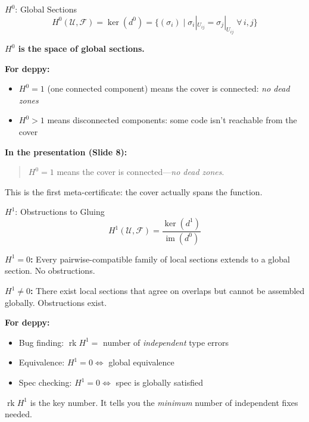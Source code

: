 \documentclass[aspectratio=169,10pt]{beamer}
\newcommand{\Fscr}{\mathcal{F}}
\newcommand{\Uscr}{\mathcal{U}}
\newcommand{\im}{\operatorname{im}}
\newcommand{\rk}{\operatorname{rk}}
\begin{document}
\begin{frame}{$H^0$: Global Sections}
\[
H^0(\Uscr, \Fscr) = \ker(d^0) = \{(\sigma_i) \mid \sigma_i|_{U_{ij}} = \sigma_j|_{U_{ij}} \;\forall\, i,j\}
\]

\textbf{$H^0$ is the space of global sections.}

\vspace{0.3em}
\textbf{For deppy:}
\begin{itemize}
  \item $H^0 = 1$ (one connected component) means the cover is connected: \emph{no dead zones}
  \item $H^0 > 1$ means disconnected components: some code isn't reachable from the cover
\end{itemize}

\textbf{In the presentation (Slide 8):}
\begin{quote}
$H^0 = 1$ means the cover is connected---\emph{no dead zones}.
\end{quote}

This is the first meta-certificate: the cover actually spans the function.
\end{frame}

\begin{frame}{$H^1$: Obstructions to Gluing}
\[
H^1(\Uscr, \Fscr) = \frac{\ker(d^1)}{\im(d^0)}
\]

\textbf{$H^1 = 0$:} Every pairwise-compatible family of local sections extends to a global section. \textcolor{good}{No obstructions.}

\textbf{$H^1 \neq 0$:} There exist local sections that agree on overlaps but cannot be assembled globally. \textcolor{exred}{Obstructions exist.}

\vspace{0.3em}
\textbf{For deppy:}
\begin{itemize}
  \item Bug finding: $\rk H^1 =$ number of \emph{independent} type errors
  \item Equivalence: $H^1 = 0 \Leftrightarrow$ global equivalence
  \item Spec checking: $H^1 = 0 \Leftrightarrow$ spec is globally satisfied
\end{itemize}

\textbf{$\rk H^1$} is the key number. It tells you the \emph{minimum} number of independent fixes needed.
\end{frame}
\end{document}
